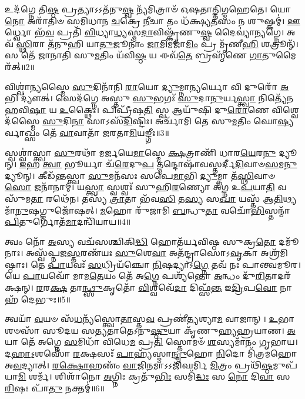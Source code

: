 𑌉𑌦᳴𑌗𑍍𑌨𑍇 𑌤𑌿\-\ul{𑌷𑍍𑌠} 𑌪𑍍𑌰𑌤𑍍𑌯𑌾𑌽𑌽𑌤᳴𑌨𑍁\-\ul{𑌷𑍍𑌵} 𑌨𑍍𑌯᳴𑌮𑌿𑌤𑍍𑌰𑌾𑍞᳴ 𑌓𑌷𑌤𑌾𑌤𑍍𑌤𑌿𑌗𑍍𑌮𑌹𑍇𑌤𑍇। 𑌯𑍋 \ul{𑌨𑍋} 𑌅𑌰𑌾᳴𑌤𑌿𑍞 𑌸𑌮𑌿𑌧𑌾𑌨 \ul{𑌚}\-𑌕𑍍𑌰𑍇 \ul{𑌨𑍀}\-𑌚𑌾 𑌤𑌂 𑌧᳴𑌕𑍍𑌷𑍍𑌯\-\ul{𑌤}\-𑌸𑌂 𑌨 𑌶𑍁𑌷𑍍𑌕𑌮𑍍॑। \ul{𑌊}\-𑌰𑍍𑌧𑍍𑌵𑍋 𑌭᳴\-\ul{𑌵} 𑌪𑍍𑌰𑌤𑌿᳴ \ul{𑌵𑌿}\-𑌧𑍍𑌯𑌾\-\ul{𑌧𑍍𑌯}\-𑌸𑍍𑌮\-\ul{𑌦𑌾}\-𑌵𑌿𑌷𑍍𑌕𑍃᳴𑌣𑍁\-\ul{𑌷𑍍𑌵} 𑌦𑍈𑌵𑍍𑌯𑌾॑𑌨𑍍𑌯𑌗𑍍𑌨𑍇। 𑌅𑌵᳴ \ul{𑌸𑍍𑌥𑌿}\-𑌰𑌾 𑌤᳴𑌨𑍁𑌹𑌿 𑌯𑌾\-\ul{𑌤𑍁}\-𑌜𑍂𑌨𑌾𑌂॑ \ul{𑌜𑌾}\-𑌮𑌿𑌮𑌜𑌾᳴\-\ul{𑌮𑌿𑌂} 𑌪𑍍𑌰 𑌮𑍃᳴𑌣𑍀\-\ul{𑌹𑌿} 𑌶𑌤𑍍𑌰𑍂𑌨𑍍᳴। 𑌸 𑌤𑍇᳴ 𑌜𑌾𑌨𑌾𑌤𑌿 𑌸𑍁\-\ul{𑌮}\-𑌤𑌿𑌂 𑌯᳴𑌵𑌿\-\ul{𑌷𑍍𑌠} 𑌯 𑌈𑌵᳴\-\ul{𑌤𑍇} 𑌬𑍍𑌰𑌹𑍍𑌮᳴𑌣𑍇 \ul{𑌗𑌾}\-𑌤𑍁𑌮𑍈𑌰᳴𑌤𑍍॥2॥

 𑌵𑌿𑌶𑍍𑌵𑌾॑𑌨𑍍𑌯𑌸𑍍𑌮𑍈 \ul{𑌸𑍁}\-𑌦𑌿𑌨𑌾᳴𑌨𑌿 \ul{𑌰𑌾}\-𑌯𑍋 \ul{𑌦𑍍𑌯𑍁}\-𑌮𑍍𑌨𑌾\-\ul{𑌨𑍍𑌯}\-𑌰𑍍𑌯𑍋 𑌵𑌿 𑌦𑍁𑌰𑍋᳴ \ul{𑌅}\-𑌭𑌿 𑌦𑍍𑌯𑍗॑𑌤𑍍। 𑌸𑍇𑌦᳴𑌗𑍍𑌨𑍇 𑌅𑌸𑍍𑌤𑍁 \ul{𑌸𑍁}\-𑌭𑌗𑌃᳴ \ul{𑌸𑍁}\-𑌦𑌾\-\ul{𑌨𑍁}\-𑌰𑍍𑌯\-\ul{𑌸𑍍𑌤𑍍𑌵𑌾} 𑌨𑌿𑌤𑍍𑌯𑍇᳴𑌨 \ul{𑌹}\-𑌵𑌿\-\ul{𑌷𑌾} 𑌯 \ul{𑌉}\-𑌕𑍍𑌥𑍈𑌃। 𑌪𑌿𑌪𑍍𑌰𑍀᳴𑌷\-\ul{𑌤𑌿} 𑌸𑍍𑌵 𑌆𑌯𑍁᳴𑌷𑌿 𑌦𑍁\-\ul{𑌰𑍋}\-𑌣𑍇 𑌵𑌿𑌶𑍍𑌵𑍇𑌦᳴𑌸𑍍𑌮𑍈 \ul{𑌸𑍁}\-𑌦𑌿\-\ul{𑌨𑌾} 𑌸𑌾𑌽𑌸᳴\-\ul{𑌦𑌿}\-𑌷𑍍𑌟𑌿𑌃। 𑌅𑌰𑍍𑌚𑌾᳴𑌮𑌿 𑌤𑍇 𑌸𑍁\-\ul{𑌮}\-𑌤𑌿𑌂 𑌘𑍋\-\ul{𑌷𑍍𑌯}\-𑌰𑍍𑌵𑌾𑌖𑍍𑌸𑌂 𑌤𑍇᳴ \ul{𑌵𑌾}\-𑌵𑌾𑌤𑌾᳴ 𑌜𑌰𑌤𑌾\-\ul{𑌮𑌿}\-𑌯𑌙𑍍𑌗𑍀𑌃॥3॥
 
𑌸𑍍𑌵𑌶𑍍𑌵𑌾॑𑌸𑍍𑌤𑍍𑌵𑌾 \ul{𑌸𑍁}\-𑌰𑌥𑌾᳴ 𑌮𑌰𑍍𑌜𑌯𑍇\-\ul{𑌮𑌾}\-𑌸𑍍𑌮𑍇 \ul{𑌕𑍍𑌷}\-𑌤𑍍𑌰𑌾𑌣𑌿᳴ 𑌧𑌾𑌰\-\ul{𑌯𑍇}\-𑌰\-\ul{𑌨𑍁} 𑌦𑍍𑌯𑍂𑌨𑍍। \ul{𑌇}\-𑌹 \ul{𑌤𑍍𑌵𑌾} 𑌭𑍂𑌰𑍍𑌯𑌾 𑌚᳴\-\ul{𑌰𑍇}\-𑌦𑍁\-\ul{𑌪} 𑌤𑍍𑌮𑌨𑍍𑌦𑍋𑌷𑌾᳴\-𑌵𑌸𑍍𑌤𑌰𑍍𑌦𑍀\-\ul{𑌦𑌿}\-𑌵𑌾𑍞\-\-\ul{𑌸}\-𑌮\-\ul{𑌨𑍁} 𑌦𑍍𑌯𑍂𑌨𑍍। 𑌕𑍀𑌡᳴𑌨𑍍𑌤𑌸𑍍𑌤𑍍𑌵𑌾 \ul{𑌸𑍁}\-𑌮𑌨᳴𑌸𑌃 𑌸𑌪𑍇\-\ul{𑌮𑌾}\-𑌭𑌿 \ul{𑌦𑍍𑌯𑍁}\-𑌮𑍍𑌨𑌾 𑌤᳴\-\ul{𑌸𑍍𑌥𑌿}\-𑌵𑌾𑍞\-\ul{𑌸𑍋} 𑌜𑌨𑌾᳴𑌨𑌾𑌮𑍍। 𑌯\-\ul{𑌸𑍍𑌤𑍍𑌵𑌾} 𑌸𑍍𑌵𑌶𑍍𑌵𑌃᳴ 𑌸𑍁𑌹𑌿\-\ul{𑌰}\-𑌣𑍍𑌯𑍋 𑌅᳴𑌗𑍍𑌨 𑌉\-\ul{𑌪}\-𑌯𑌾\-\ul{𑌤𑌿} 𑌵𑌸𑍁᳴𑌮\-\ul{𑌤𑌾} 𑌰𑌥𑍇᳴𑌨। 𑌤𑌸𑍍𑌯᳴ \ul{𑌤𑍍𑌰𑌾}\-𑌤𑌾 𑌭᳴𑌵\-\ul{𑌸𑌿} 𑌤\-\ul{𑌸𑍍𑌯} 𑌸\-\ul{𑌖𑌾} 𑌯𑌸𑍍𑌤᳴ 𑌆\-\ul{𑌤𑌿}\-𑌥𑍍𑌯𑌮𑌾᳴\-\ul{𑌨𑍁}\-𑌷𑌗𑍍𑌜𑍁𑌜𑍋᳴𑌷𑌤𑍍। \ul{𑌮}\-𑌹𑍋 𑌰𑍁᳴𑌜𑌾𑌮𑌿 \ul{𑌬}\-𑌨𑍍𑌧𑍁\-\ul{𑌤𑌾} 𑌵𑌚𑍋᳴\-\ul{𑌭𑌿}\-𑌸𑍍𑌤𑌨𑍍𑌮𑌾᳴ \ul{𑌪𑌿}\-𑌤𑍁𑌰𑍍𑌗𑍋𑌤᳴\-\ul{𑌮𑌾}\-𑌦𑌨𑍍𑌵𑌿᳴𑌯𑌾𑌯॥4॥

 𑌤𑍍𑌵𑌂 𑌨𑍋᳴ \ul{𑌅}\-𑌸𑍍𑌯 𑌵𑌚᳴𑌸𑌶𑍍𑌚𑌿𑌕𑌿\-\ul{𑌦𑍍𑌧𑌿} 𑌹𑍋𑌤᳴𑌰𑍍𑌯𑌵𑌿𑌷𑍍𑌠 𑌸𑍁𑌕𑍍𑌰\-\ul{𑌤𑍋} 𑌦𑌮𑍂᳴𑌨𑌾𑌃। 𑌅𑌸𑍍𑌵᳴𑌪𑍍𑌨𑌜\-\ul{𑌸𑍍𑌤}\-𑌰𑌣᳴𑌯𑌃 \ul{𑌸𑍁}\-𑌶𑍇\-\ul{𑌵𑌾} 𑌅𑌤᳴𑌨𑍍𑌦𑍍𑌰𑌾𑌸𑍋𑌽\-\ul{𑌵𑍃}\-𑌕𑌾 𑌅𑌶𑍍𑌰᳴𑌮𑌿𑌷𑍍𑌠𑌾𑌃। 𑌤𑍇 \ul{𑌪𑌾}\-𑌯𑌵𑌃᳴ \ul{𑌸}\-𑌧𑍍𑌰𑌿𑌯᳴𑌞𑍍𑌚𑍋 \ul{𑌨𑌿}\-𑌷𑌦𑍍𑌯𑌾𑌽\-\ul{𑌗𑍍𑌨𑍇} 𑌤𑌵᳴ 𑌨𑌃 𑌪𑌾𑌨𑍍𑌤𑍍𑌵𑌮𑍂𑌰। 𑌯𑍇 \ul{𑌪𑌾}\-𑌯𑌵𑍋᳴ 𑌮𑌾𑌮\-\ul{𑌤𑍇}\-𑌯𑌂 𑌤𑍇᳴ 𑌅\-\ul{𑌗𑍍𑌨𑍇} 𑌪𑌶𑍍𑌯᳴𑌨𑍍𑌤𑍋 \ul{𑌅}\-𑌨𑍍𑌧𑌂 𑌦𑍁᳴\-\ul{𑌰𑌿}\-𑌤𑌾𑌦𑌰᳴𑌕𑍍𑌷𑌨𑍍। \ul{𑌰}\-𑌰\-\ul{𑌕𑍍𑌷} 𑌤𑌾\-\ul{𑌨𑍍𑌥𑍍𑌸𑍁}\-𑌕𑍃𑌤𑍋᳴ \ul{𑌵𑌿}\-𑌶𑍍𑌵𑌵𑍇᳴\-\ul{𑌦𑌾} 𑌦𑌿𑌫𑍍𑌸᳴\-\ul{𑌨𑍍𑌤} 𑌇\-\ul{𑌦𑍍𑌰𑌿}\-𑌪\-\ul{𑌵𑍋} 𑌨𑌾 𑌹᳴ 𑌦𑍇𑌭𑍁𑌃॥5॥
 
𑌤𑍍𑌵𑌯𑌾᳴ \ul{𑌵}\-𑌯𑍞 𑌸᳴\-\ul{𑌧}\-𑌨𑍍𑌯᳴𑌸𑍍𑌤𑍍𑌵𑍋\-\ul{𑌤𑌾}\-𑌸𑍍𑌤\-\ul{𑌵} 𑌪𑍍𑌰𑌣𑍀॑𑌤𑍍𑌯𑌶𑍍𑌯𑌾\-\ul{𑌮} 𑌵𑌾𑌜𑌾𑌨𑍍। \ul{𑌉}\-𑌭𑌾 𑌶𑍞𑌸𑌾᳴ 𑌸𑍂𑌦𑌯 𑌸𑌤𑍍𑌯𑌤𑌾𑌤𑍇𑌽𑌨𑍁\-\ul{𑌷𑍍𑌠𑍁}\-𑌯𑌾 𑌕𑍃᳴𑌣𑍁𑌹𑍍𑌯𑌹𑍍𑌰𑌯𑌾𑌣। \ul{𑌅}\-𑌯𑌾 𑌤𑍇᳴ 𑌅𑌗𑍍𑌨𑍇 \ul{𑌸}\-𑌮𑌿𑌧𑌾᳴ 𑌵𑌿𑌧𑍇\-\ul{𑌮} 𑌪𑍍𑌰\-\ul{𑌤𑌿} 𑌸𑍍𑌤𑍋𑌮𑍞᳴ \ul{𑌶}\-𑌸𑍍𑌯𑌮𑌾᳴𑌨𑌂 𑌗𑍃𑌭𑌾𑌯। 𑌦\-\ul{𑌹𑌾}\-𑌽॒𑌶𑌸𑍋᳴ \ul{𑌰}\-𑌕𑍍𑌷𑌸𑌃᳴ \ul{𑌪𑌾}\-𑌹𑍍𑌯᳴𑌸𑍍𑌮𑌾\-\ul{𑌨𑍍𑌦𑍍𑌰𑍁}\-𑌹𑍋 \ul{𑌨𑌿}\-𑌦𑍋 𑌮𑌿᳴𑌤𑍍𑌰𑌮𑌹𑍋 𑌅\-\ul{𑌵}\-𑌦𑍍𑌯𑌾𑌤𑍍। \ul{𑌰}\-\-\ul{𑌕𑍍𑌷𑍋}\-𑌹𑌣𑌂᳴ \ul{𑌵𑌾}\-𑌜𑌿\-\ul{𑌨}\-𑌮𑌾𑌽𑌽𑌜𑌿᳴𑌘𑌰𑍍𑌮𑌿 \ul{𑌮𑌿}\-𑌤𑍍𑌰𑌂 𑌪𑍍𑌰𑌥𑌿᳴\-\ul{𑌷𑍍𑌠}\-𑌮𑍁𑌪᳴ 𑌯𑌾\-\ul{𑌮𑌿} 𑌶𑌰𑍍𑌮᳴। 𑌶𑌿𑌶𑌾᳴𑌨𑍋 \ul{𑌅}\-𑌗𑍍𑌨𑌿𑌃 𑌕𑍍𑌰𑌤𑍁᳴\-\ul{𑌭𑌿𑌃} 𑌸𑌮𑌿᳴\-\ul{𑌦𑍍𑌧𑌃} 𑌸 \ul{𑌨𑍋} 𑌦𑌿\-\ul{𑌵𑌾} 𑌸 \ul{𑌰𑌿}\-𑌷𑌃 𑌪𑌾᳴\-\ul{𑌤𑍁} 𑌨𑌕𑍍𑌤𑌮𑍍॑॥6॥

